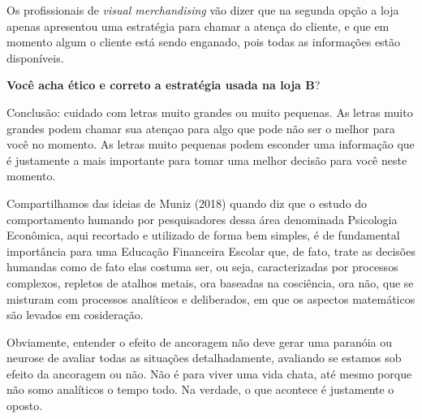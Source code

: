 Os profissionais de \textit{visual merchandising} vão dizer que na segunda opção a loja apenas apresentou uma estratégia para chamar a atença do cliente, e que em momento algum o cliente está sendo enganado, pois todas as informações estão disponíveis. 

\textbf{Você acha ético e correto a estratégia usada na loja B}?

Conclusão: cuidado com letras muito grandes ou muito pequenas. As letras muito grandes podem chamar sua atençao para algo que pode não ser o melhor para você no momento. As letras muito pequenas podem esconder uma informação que é justamente a mais importante para tomar uma melhor decisão para você neste momento.

Compartilhamos das ideias de Muniz (2018) quando diz que o estudo do comportamento humando por pesquisadores dessa área denominada Psicologia Econômica, aqui recortado e utilizado de forma bem simples, é  de fundamental importância para uma Educação Financeira Escolar que, de fato, trate as decisões humandas como de fato elas costuma ser, ou seja, caracterizadas por processos complexos, repletos de atalhos metais, ora baseadas na cosciência, ora não, que se misturam com processos analíticos e deliberados, em que os aspectos matemáticos são levados em cosideração.

Obviamente, entender o efeito de ancoragem não deve gerar uma paranóia ou neurose de avaliar todas as situações detalhadamente, avaliando se estamos sob efeito da ancoragem ou não. Não é para viver uma vida chata, até mesmo porque não somo analíticos o tempo todo. Na verdade, o que acontece é justamente o oposto.

\clearpage

